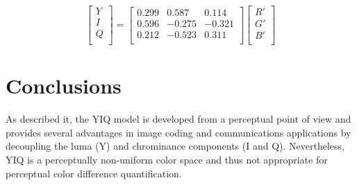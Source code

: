 \documentclass[10pt,twocolumn,letterpaper]{article}
\begin{document}
\begin{equation}
\left[
\begin{array}{c}
Y\\I\\Q\\\end{array} \right] = \left[\begin{array}{ccc} 0.299 &0.587 &0.114\\0.596& -0.275 &-0.321\\0.212 &-0.523 &0.311\\
\end{array} \right]
\left[ \begin{array}{c}R'\\G'\\B'\\\end{array} \right]
\label{fig:onecol}
\end{equation}

\section{Conclusions}
As described it, the YIQ model is developed from a perceptual point of view and provides several advantages in image coding and communications applications by decoupling the luma (Y) and chrominance components (I and Q). Nevertheless, YIQ is a perceptually non-uniform color space and thus not appropriate for perceptual color difference quantification.
{\small


}
\end{document}
